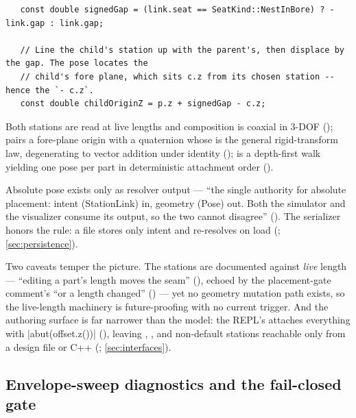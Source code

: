 \begin{verbatim}
   const double signedGap = (link.seat == SeatKind::NestInBore) ? -link.gap : link.gap;

   // Line the child's station up with the parent's, then displace by the gap. The pose locates the
   // child's fore plane, which sits c.z from its chosen station -- hence the `- c.z`.
   const double childOriginZ = p.z + signedGap - c.z;
\end{verbatim}

\noindent Both stations are read at live lengths and composition is coaxial in 3-DOF
();  pairs a fore-plane origin with a quaternion
whose  is the general rigid-transform law, degenerating to vector addition under
identity ();  is a depth-first walk
yielding one pose per part in deterministic attachment order
().

\begin{designrule}
Absolute pose exists only as resolver output --- ``the single authority for absolute placement:
intent (StationLink) in, geometry (Pose) out. Both the simulator and the visualizer consume its
output, so the two cannot disagree'' (). The serializer honors
the rule: a  file stores only  intent and re-resolves on load
(; \cref{sec:persistence}).
\end{designrule}

Two caveats temper the picture. The stations are documented against \emph{live} length ---
``editing a part's length moves the seam'' (), echoed by the
placement-gate comment's ``or a length changed'' () --- yet no
geometry mutation path exists, so the live-length machinery is future-proofing with no current
trigger. And the authoring surface is far narrower than the model: the REPL's 
attaches everything with \cppinline|abut(offset.z())| (), leaving
, , and non-default stations reachable only from a design file or
C++ (; \cref{sec:interfaces}).

\subsection{Envelope-sweep diagnostics and the fail-closed gate}\label{sec:model-sweep}

